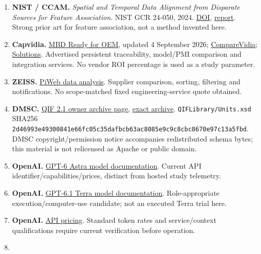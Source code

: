 \documentclass[
  11pt,
]{article}
\begin{document}
\begin{enumerate}
{  archive}. Archive hash begins \texttt{9ae303335274}. Supplied
  graphs/models are existing baseline assets.
\item
  \textbf{NIST / CCAM.} \emph{Spatial and Temporal Data Alignment from
  Disparate Sources for Feature Association}. NIST GCR 24-050, 2024.
  \href{https://doi.org/10.6028/NIST.GCR.24-050}{DOI},
  \href{https://tsapps.nist.gov/publication/get_pdf.cfm?pub_id=957946}{report}.
  Strong prior art for feature association, not a method invented here.
\item
  \textbf{Capvidia.}
  \href{https://kb.capvidia.com/docs/mbd-ready-for-oem}{MBD Ready for
  OEM}, updated 4 September 2026;
  \href{https://www.capvidia.com/products/comparevidia}{CompareVidia};
  \href{https://www.capvidia.com/solutions}{Solutions}. Advertised
  persistent traceability, model/PMI comparison and integration
  services. No vendor ROI percentage is used as a study parameter.
\item
  \textbf{ZEISS.}
  \href{https://www.zeiss.com/metrology/en/software/zeiss-piweb/data-analysis.html}{PiWeb
  data analysis}. Supplier comparison, sorting, filtering and
  notifications. No scope-matched fixed engineering-service quote
  obtained.
\item
  \textbf{DMSC.} \href{https://qifstandards.org/qif-2-1/}{QIF 2.1 owner
  archive page},
  \href{https://qifstandards.org/wp-content/uploads/2015/03/QIF-2.1.zip}{exact
  archive}. \texttt{QIFLibrary/\allowbreak{}Units.\allowbreak{}xsd} SHA256
  \texttt{2d46993e\allowbreak{}49300841\allowbreak{}e66fc05c\allowbreak{}35dafbcb\allowbreak{}63ac8085\allowbreak{}e9c9c8cb\allowbreak{}c8670e97\allowbreak{}c13a5fbd}.
  DMSC copyright/permission notice accompanies redistributed schema
  bytes; this material is not relicensed as Apache or public domain.
\item
  \textbf{OpenAI.}
  \href{https://developers.openai.com/api/docs/models/gpt-6-astra}{GPT-6
  Astra model documentation}. Current API
  identifier/capabilities/prices, distinct from hosted study telemetry.
\item
  \textbf{OpenAI.}
  \href{https://developers.openai.com/api/docs/models/gpt-6.1-terra}{GPT-6.1
  Terra model documentation}. Role-appropriate execution/computer-use
  candidate; not an executed Terra trial here.
\item
  \textbf{OpenAI.}
  \href{https://developers.openai.com/api/docs/pricing}{API pricing}.
  Standard token rates and service/context qualifications require
  current verification before operation.
\item

\end{enumerate}
\end{document}
